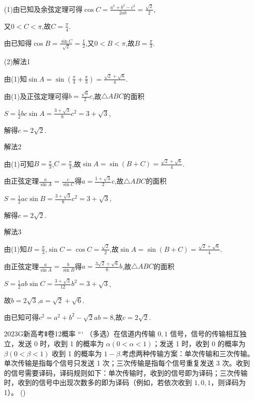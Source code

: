 \documentclass[12pt,UTF-8,a4paper]{ctexart}
\numberwithin{figure}{section}
\theoremstyle{mystyle}
\theoremstyle{mystylekaishu}
\theoremstyle{mystyle}
\numberwithin{xiti}{section}
\begin{document}
\begin{solutions}
(1)由已知及余弦定理可得$\cos C=\frac{a^{2}+b^{2}-c^{2}}{2ab}=\frac{\sqrt{2}}{2}$,

又$0<C<\pi$,故$C=\frac{\pi}{4}$.

由已知得$\cos B=\frac{\sin C}{\sqrt{2}}=\frac{1}{2}$,又$0<B<\pi$,故$B=\frac{\pi}{3}$.

(2)解法1

由(1)知$\sin A=\sin\left(\frac{\pi}{4}+\frac{\pi}{3}\right)=\frac{\sqrt{2}+\sqrt{6}}{4}$.

由(1)及正弦定理可得$b=\frac{\sqrt{6}}{2}c$,故$\triangle ABC$的面积

$S=\frac{1}{2}bc\sin A=\frac{3+\sqrt{3}}{8}c^{2}=3+\sqrt{3}$,

解得$c=2\sqrt{2}$.

解法2

由(1)可知$B=\frac{\pi}{3}$,$C=\frac{\pi}{4}$,故$\sin A=\sin(B+C)=\frac{\sqrt{2}+\sqrt{6}}{4}$.

由正弦定理$\frac{a}{\sin A}=\frac{c}{\sin C}$得$a=\frac{1+\sqrt{3}}{2}c$,故$\triangle ABC$的面积

$S=\frac{1}{2}ac\sin B=\frac{3+\sqrt{3}}{8}c^{2}=3+\sqrt{3}$,

解得$c=2\sqrt{2}$.

解法3

由(1)知$B=\frac{\pi}{3}$,$\sin C=\cos C=\frac{\sqrt{2}}{2}$,故$\sin A=\sin(B+C)=\frac{\sqrt{2}+\sqrt{6}}{4}$.

由正弦定理$\frac{a}{\sin A}=\frac{b}{\sin B}$得$a=\frac{3\sqrt{2}+\sqrt{6}}{6}b$,故$\triangle ABC$的面积

$S=\frac{1}{2}ab\sin C=\frac{3+\sqrt{3}}{12}b^{2}=3+\sqrt{3}$,

故$b=2\sqrt{3}$,$a=\sqrt{2}+\sqrt{6}$.

由已知可得$c^{2}=a^{2}+b^{2}-\sqrt{2}ab=8$,故$c=2\sqrt{2}$.
\end{solutions}


\begin{problem}{2023}{G}{新高考Ⅱ卷}{12}{概率}
```
（多选）在信道内传输 $0,1$ 信号，信号的传输相互独立，发送 0 时，收到 1 的概率为 $\alpha(0<\alpha<1)$；发送 1 时，收到 0 的概率为 $\beta(0<\beta<1)$ 收到 1 的概率为 $1-\beta$.考虑两种传输方案：单次传输和三次传输。单次传输是指每个信号只发送 1 次；三次传输是指每个信号重复发送 3 次。收到的信号需要译码，译码规则如下：单次传输时，收到的信号即为译码；三次传输时，收到的信号中出现次数多的即为译码（例如，若依次收到 $1,0,1$，则译码为 1）。 (\hspace{1cm})
\begin{choices}
\end{choices}
\end{problem}
\end{document}
